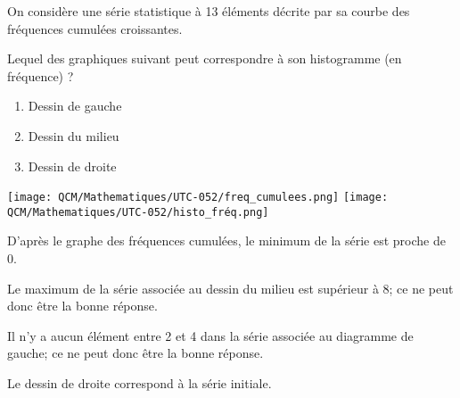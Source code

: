 \documentclass[avery5371]{flashcards}
\begin{document}
\begin{flashcard}{
\justify

\begin{minipage}[c]{0.6\linewidth}
On considère une série statistique à 13 éléments décrite par sa courbe des fréquences cumulées croissantes.

Lequel des graphiques suivant peut correspondre à son histogramme (en fréquence) ?
    \begin{enumerate}
        \item Dessin de gauche
        \item Dessin du milieu
    	\item Dessin de droite
    \end{enumerate}
\end{minipage}%
\hfill
\begin{minipage}[c]{0.3\linewidth}
    \strut\vspace*{-\baselineskip}\newline
    \texttt{[image: QCM/Mathematiques/UTC-052/freq\_cumulees.png]}
    \texttt{[image: QCM/Mathematiques/UTC-052/histo\_fréq.png]}
\end{minipage}
}
\justify
D'après le graphe des fréquences cumulées, le minimum de la série est proche de 0.

Le maximum de la série associée au dessin du milieu est supérieur à 8; ce ne peut donc être la bonne réponse.

Il n'y a aucun élément entre 2 et 4 dans la série associée au diagramme de gauche; ce ne peut donc être la bonne réponse.

Le dessin de droite correspond à la série initiale.
\end{flashcard}
\end{document}
